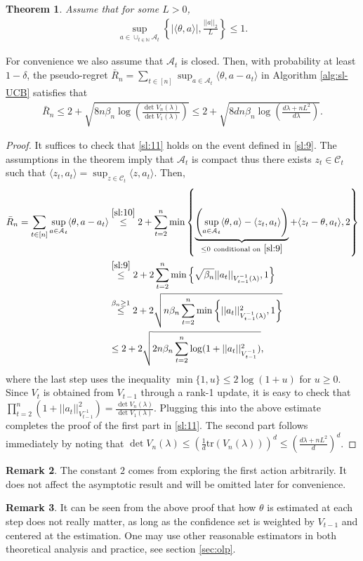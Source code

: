 \documentclass[10pt,a4article]{amsart}
\numberwithin{equation}{section}
\theoremstyle{plain}
\newtheorem{Th}{Theorem}
\theoremstyle{definition}
\newtheorem{Rem}[Th]{Remark}
\def\N{{\mathbb N}}
\def\t{{\theta}}
\begin{document}
\begin{Th}
Assume that for some $L>0$, 
\begin{align}
\sup_{a\in\cup_{t\in\N}\mathcal A_t}\left\{|\langle\t, a\rangle|, \frac{||a||_2}{L}\right\}\leq 1. \label{sl:10}
\end{align}
\end{Th}
For convenience we also assume that $\mathcal A_t$ is closed. Then, with probability at least $1-\delta$, the pseudo-regret $\bar{R}_n=\sum_{t\in [n]}\sup_{a\in\mathcal A_t}\langle\t, a-a_t\rangle$ in Algorithm \ref{alg:sl-UCB} satisfies that
\begin{align}
\bar{R}_n\leq 2+\sqrt{8n\beta_n\log\left(\frac{\det V_n(\lambda)}{\det V_1(\lambda)}\right)}\leq 2+\sqrt{8dn\beta_n\log\left(\frac{d\lambda+nL^2}{d\lambda}\right)}. \label{sl:11}
\end{align}
\begin{proof}
It suffices to check that \eqref{sl:11} holds on the event defined in \eqref{sl:9}. The assumptions in the theorem imply that $\mathcal A_t$ is compact thus there exists $z_t\in\mathcal C_t$ such that $\langle z_t, a_t\rangle = \sup_{z\in\mathcal C_t}\langle z, a_t\rangle$. Then,
\begin{align*}
\bar{R}_n = \sum_{t\in [n]}\sup_{a\in\mathcal A_t}\langle\t, a-a_t\rangle&\stackrel{\eqref{sl:10}}{\leq} 2+ \sum_{t=2}^n\min\left\{\underbrace{\left(\sup_{a\in\mathcal A_t}\langle\t, a\rangle-\langle z_t, a_t\rangle\right)}_{\leq 0 \ \text{conditional on}\ \eqref{sl:9}}+\langle z_t-\t, a_t\rangle, 2\right\}\\
&\stackrel{\eqref{sl:9}}{\leq} 2+2\sum_{t=2}^n \min\left\{\sqrt{\beta_n}||a_t||_{V^{-1}_{t-1}(\lambda)}, 1\right\}\\
&\stackrel{\beta_n\geq 1}{\leq} 2+2\sqrt{n\beta_n\sum_{t=2}^n\min\left\{||a_t||^2_{V^{-1}_{t-1}(\lambda)}, 1\right\}}\\
&\leq 2+2\sqrt{2n\beta_n\sum_{t=2}^n\log (1+||a_t||^2_{V^{-1}_{t-1}})},
\end{align*} 
where the last step uses the inequality $\min\{1, u\}\leq 2\log(1+u)$ for $u\geq 0$. Since $V_t$ is obtained from $V_{t-1}$ through a rank-1 update, it is easy to check that $\prod_{t=2}^n (1+||a_t||^2_{V^{-1}_{t-1}})=\frac{\det V_n(\lambda)}{\det V_1(\lambda)}$. Plugging this into the above estimate completes the proof of the first part in \eqref{sl:11}. The second part follows immediately by noting that $\det V_n(\lambda)\leq (\frac{1}{d}\text{tr}(V_n(\lambda)))^d\leq (\frac{d\lambda + nL^2}{d})^d$.
\end{proof}
\begin{Rem}
The constant $2$ comes from exploring the first action arbitrarily. It does not affect the asymptotic result and will be omitted later for convenience. 
\end{Rem}
\begin{Rem}
It can be seen from the above proof that how $\t$ is estimated at each step does not really matter, as long as the confidence set is weighted by $V_{t-1}$ and centered at the estimation. One may use other reasonable estimators in both theoretical analysis and practice, see section \ref{sec:olp}. 
\end{Rem}
\end{document}

